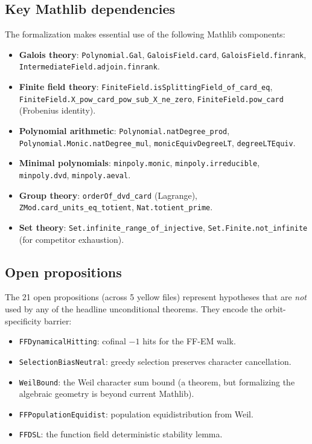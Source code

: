 \subsection{Key Mathlib dependencies}

The formalization makes essential use of the following Mathlib components:

\begin{itemize}
  \item \textbf{Galois theory}: \texttt{Polynomial.Gal},
    \texttt{GaloisField.card}, \texttt{GaloisField.finrank},
    \texttt{IntermediateField.adjoin.finrank}.
  \item \textbf{Finite field theory}: \texttt{FiniteField.isSplittingField\_of\_card\_eq},
    \texttt{FiniteField.X\_pow\_card\_pow\_sub\_X\_ne\_zero},
    \texttt{FiniteField.pow\_card} (Frobenius identity).
  \item \textbf{Polynomial arithmetic}: \texttt{Polynomial.natDegree\_prod},
    \texttt{Polynomial.Monic.natDegree\_mul},
    \texttt{monicEquivDegreeLT}, \texttt{degreeLTEquiv}.
  \item \textbf{Minimal polynomials}: \texttt{minpoly.monic},
    \texttt{minpoly.irreducible}, \texttt{minpoly.dvd},
    \texttt{minpoly.aeval}.
  \item \textbf{Group theory}: \texttt{orderOf\_dvd\_card} (Lagrange),
    \texttt{ZMod.card\_units\_eq\_totient},
    \texttt{Nat.totient\_prime}.
  \item \textbf{Set theory}: \texttt{Set.infinite\_range\_of\_injective},
    \texttt{Set.Finite.not\_infinite} (for competitor exhaustion).
\end{itemize}

\subsection{Open propositions}

The 21 open propositions (across 5 yellow files) represent hypotheses
that are \emph{not} used by any of the headline unconditional theorems.
They encode the orbit-specificity barrier:

\begin{itemize}
  \item \texttt{FFDynamicalHitting}: cofinal $-1$ hits for the FF-EM walk.
  \item \texttt{SelectionBiasNeutral}: greedy selection preserves character
    cancellation.
  \item \texttt{WeilBound}: the Weil character sum bound (a theorem, but
    formalizing the algebraic geometry is beyond current Mathlib).
  \item \texttt{FFPopulationEquidist}: population equidistribution from Weil.
  \item \texttt{FFDSL}: the function field deterministic stability lemma.
\end{itemize}

